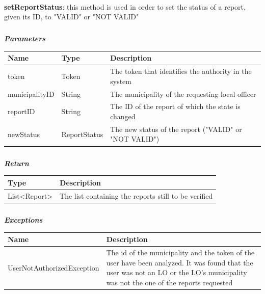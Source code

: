 					\paragraph{}
							\textbf{setReportStatus}: this method is used in order to set the status of a report, given its ID, to "VALID" or "NOT VALID"
							\subparagraph{}
							\vspace{-3mm}
							\textit{\textbf{Parameters}}
							\vspace{-2mm}
								\begin{table}[!h]
									\begin{tabular}{L{0.2\textwidth}L{0.2\textwidth}L{0.45\textwidth}}
										\toprule
										\textbf{Name} & \textbf{Type} & \textbf{Description} \\
										\midrule
								  		token & Token & The token that identifies the authority in the system \\
								  		municipalityID & String & The municipality of the requesting local officer \\
								  		reportID & String & The ID of the report of which the state is changed \\
								  		newStatus & ReportStatus & The new status of the report ("VALID" or "NOT VALID") \\
								 		\bottomrule
									\end{tabular}
								\end{table}
							\subparagraph{}
							\vspace{-6mm}
								\textit{\textbf{Return}}
								\vspace{-2mm}
									\begin{table}[!h]
									\begin{tabular}{L{0.2\textwidth}L{0.6\textwidth}}
										\toprule
										\textbf{Type} & \textbf{Description} \\
										\midrule
								  		List<Report> & The list containing the reports still to be verified \\
								 		\bottomrule
									\end{tabular}
								\end{table}
							\clearpage
							\subparagraph{}
								\textit{\textbf{Exceptions}}
								\vspace{-2mm}
									\begin{table}[!h]
									\begin{tabular}{L{0.4\textwidth}L{0.4\textwidth}}
										\toprule
										\textbf{Name} & \textbf{Description} \\
										\midrule
								  	UserNotAuthorizedException & The id of the municipality and the token of the user have been analyzed. It was found that the user was not an LO or the LO's municipality was not the one of the reports requested \\
								 		\bottomrule
									\end{tabular}
								\end{table}


